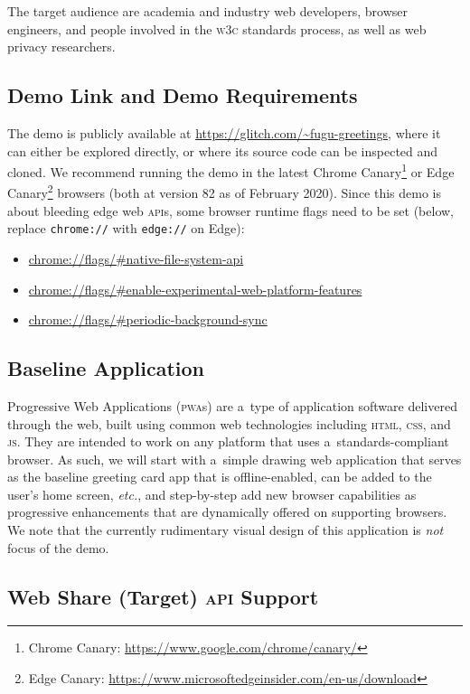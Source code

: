 \documentclass[sigconf]{acmart}
\begin{document}
The target audience are academia and industry web developers, browser engineers,
and people involved in the \textsc{w3c} standards process,
as well as web privacy researchers.

\subsection{Demo Link and Demo Requirements}

The demo is publicly available at \url{https://glitch.com/~fugu-greetings},
where it can either be explored directly,
or where its source code can be inspected and cloned.
We recommend running the demo in the latest Chrome
Canary\footnote{Chrome Canary: \url{https://www.google.com/chrome/canary/}}
or Edge
Canary\footnote{Edge Canary: \url{https://www.microsoftedgeinsider.com/en-us/download}}
browsers (both at version 82 as of February 2020).
Since this demo is about bleeding edge web \textsc{api}s,
some browser runtime flags need to be set (below, replace \texttt{chrome://}
with \texttt{edge://} on Edge):

\begin{itemize}
  \item \url{chrome://flags/#native-file-system-api}
  \item \url{chrome://flags/#enable-experimental-web-platform-features}  
  \item \url{chrome://flags/#periodic-background-sync}
\end{itemize}

\subsection{Baseline Application}

Progressive Web Applications (\textsc{pwa}s) are a~type of application software
delivered through the web, built using common web technologies
including \textsc{html}, \textsc{css}, and \textsc{js}.
They are intended to work on any platform that uses a~standards-compliant browser.
As such, we will start with a~simple drawing web application
that serves as the baseline greeting card app that is offline-enabled,
can be added to the user's home screen, \textit{etc.},
and step-by-step add new browser capabilities
as progressive enhancements that are dynamically offered on supporting browsers.
We note that the currently rudimentary visual design of this application is \textit{not} focus of the demo.

\subsection{Web Share (Target) \textsc{api} Support}
\end{document}
